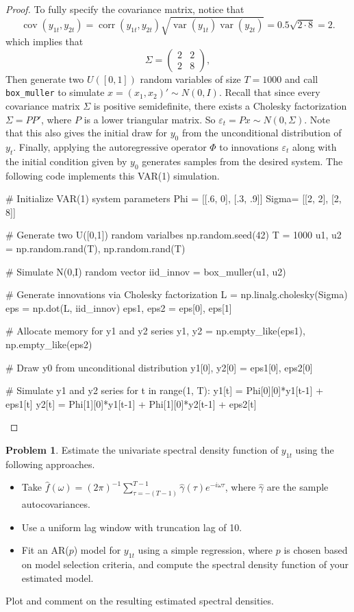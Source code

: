 \documentclass[oneside,reqno]{amsart}
\DeclareMathOperator{\var}{var}
\DeclareMathOperator{\cov}{cov}
\DeclareMathOperator{\corr}{corr}
\newcommand{\eps}{\varepsilon}
\theoremstyle{definition}
\newtheorem{prob}{Problem}
\begin{document}
\begin{proof}
To fully specify the covariance matrix, notice that
\[
	\cov(y_{1t}, y_{2t}) =\corr(y_{1t}, y_{2t}) \sqrt{\var(y_{1t})\var(y_{2t})} = 0.5 \sqrt{2 \cdot 8} = 2.
\]
which implies that
\[
	\Sigma = \begin{pmatrix}
			2 & 2 \\
			2 & 8
	\end{pmatrix},
\] 
Then generate two $U([0,1])$ random variables of size $T=1000$ and call \texttt{box_muller} to simulate $x = (x_1, x_2)' \sim N(0,I)$.  Recall that since every covariance matrix $\Sigma$ is positive semidefinite, there exists a Cholesky factorization $\Sigma = PP'$, where $P$ is a lower triangular matrix. So $\eps_t = P x \sim N(0, \Sigma)$. Note that this also gives the initial draw for $y_0$ from the unconditional distribution of $y_t$. Finally, applying the autoregressive operator $\Phi$ to innovations $\eps_t$ along with the initial condition given by $y_0$ generates samples from the desired system. The following code implements this VAR(1) simulation.

\begin{python3code}
# Initialize VAR(1) system parameters
Phi = [[.6, 0], [.3, .9]]
Sigma= [[2, 2], [2, 8]]

# Generate two U([0,1]) random varialbes 
np.random.seed(42)
T = 1000
u1, u2 = np.random.rand(T), np.random.rand(T)

# Simulate N(0,I) random vector 
iid_innov = box_muller(u1, u2)

# Generate innovations via Cholesky factorization  
L = np.linalg.cholesky(Sigma)
eps = np.dot(L, iid_innov)
eps1, eps2 = eps[0], eps[1]

# Allocate memory for y1 and y2 series 
y1, y2 = np.empty_like(eps1), np.empty_like(eps2)

# Draw y0 from unconditional distribution 
y1[0], y2[0] = eps1[0], eps2[0]

# Simulate y1 and y2 series  
for t in range(1, T):
    y1[t] = Phi[0][0]*y1[t-1] + eps1[t]
    y2[t] = Phi[1][0]*y1[t-1] + Phi[1][0]*y2[t-1] + eps2[t]
\end{python3code}
\end{proof}


\begin{prob}
Estimate the univariate spectral density function of $y_{1t}$ using the following approaches.
\begin{itemize}
\item
Take $\hat f(\omega) = (2\pi)^{-1} \sum_{\tau=-(T-1)}^{T-1} \hat \gamma(\tau) e^{-i \omega \tau}$, where $\hat \gamma$ are the sample autocovariances. 
\item
Use a uniform lag window with truncation lag of 10.
\item
Fit an AR($p$) model for $y_{1t}$ using a simple regression, where $p$ is chosen based on model selection criteria, and compute the spectral density function of your estimated model.
\end{itemize}
Plot and comment on the resulting estimated spectral densities.
\end{prob}
\end{document}
